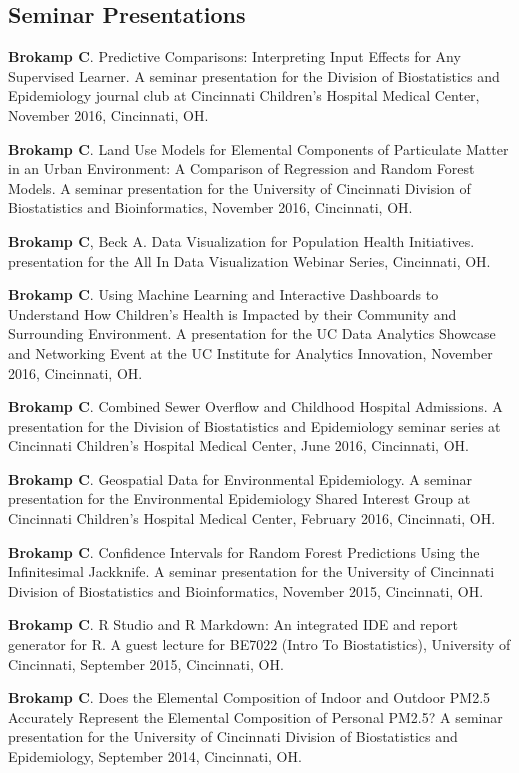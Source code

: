 \documentclass[margin,line]{res}
\newenvironment{list3}{
  \begin{list}{}{%
      \setlength{\itemsep}{0in}
      \setlength{\parsep}{0in} \setlength{\parskip}{0in}
      \setlength{\topsep}{0in} \setlength{\partopsep}{0in} 
      \setlength{\leftmargin}{0in}}}{\end{list}}
\begin{document}
\begin{resume}
\section{\sc Seminar Presentations}
\begin{list3} \itemsep 4pt
\item[] \textbf{Brokamp C}. Predictive Comparisons: Interpreting Input Effects for Any Supervised Learner. A seminar presentation for the Division of Biostatistics and Epidemiology journal club at Cincinnati Children's Hospital Medical Center, November 2016, Cincinnati, OH.
\item[] \textbf{Brokamp C}. Land Use Models for Elemental Components of Particulate Matter in an Urban Environment: A Comparison of Regression and Random Forest Models. A seminar presentation for the University of Cincinnati Division of Biostatistics and Bioinformatics, November 2016, Cincinnati, OH.
\item[] \textbf{Brokamp C}, Beck A. Data Visualization for Population Health Initiatives.  presentation for the All In Data Visualization Webinar Series, Cincinnati, OH.
\item[] \textbf{Brokamp C}. Using Machine Learning and Interactive Dashboards to Understand How Children's Health is Impacted by their Community and Surrounding Environment. A presentation for the UC Data Analytics Showcase and Networking Event at the UC Institute for Analytics Innovation, November 2016, Cincinnati, OH.
\item[] \textbf{Brokamp C}. Combined Sewer Overflow and Childhood Hospital Admissions. A presentation for the Division of Biostatistics and Epidemiology seminar series at Cincinnati Children's Hospital Medical Center, June 2016, Cincinnati, OH.
\item[] \textbf{Brokamp C}. Geospatial Data for Environmental Epidemiology. A seminar presentation for the Environmental Epidemiology Shared Interest Group at Cincinnati Children's Hospital Medical Center, February 2016, Cincinnati, OH.
\item[] \textbf{Brokamp C}. Confidence Intervals for Random Forest Predictions Using the Infinitesimal Jackknife. A seminar presentation for the University of Cincinnati Division of Biostatistics and Bioinformatics, November 2015, Cincinnati, OH.
\item[] \textbf{Brokamp C}. R Studio and R Markdown: An integrated IDE and report generator for R. A guest lecture for BE7022 (Intro To Biostatistics), University of Cincinnati, September 2015, Cincinnati, OH.
\item[] \textbf{Brokamp C}. Does the Elemental Composition of Indoor and Outdoor PM2.5 Accurately Represent the Elemental Composition of Personal PM2.5? A seminar presentation for the University of Cincinnati Division of Biostatistics and Epidemiology, September 2014, Cincinnati, OH. 

\end{list3}
\end{resume}
\end{document}
